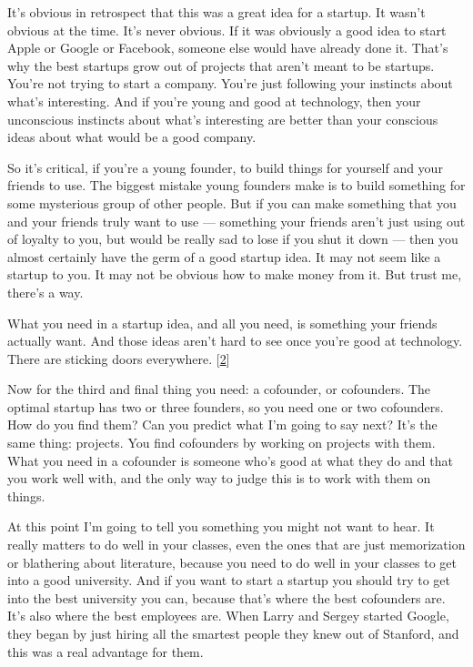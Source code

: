 It's obvious in retrospect that this
                  was a great idea for a startup. It wasn't obvious at the time.
                  It's never obvious. If it was obviously a good idea to start
                  Apple or Google or Facebook, someone else would have already
                  done it. That's why the best startups grow out of projects
                  that aren't meant to be startups. You're not trying to start a
                  company. You're just following your instincts about what's
                  interesting. And if you're young and good at technology, then
                  your unconscious instincts about what's interesting are better
                  than your conscious ideas about what would be a good
                  company.

So it's critical, if you're a young
                  founder, to build things for yourself and your friends to use.
                  The biggest mistake young founders make is to build something
                  for some mysterious group of other people. But if you can make
                  something that you and your friends truly want to use ---
                  something your friends aren't just using out of loyalty to
                  you, but would be really sad to lose if you shut it down
                  --- then you almost certainly have the germ of a good
                  startup idea. It may not seem like a startup to you. It may
                  not be obvious how to make money from it. But trust me,
                  there's a way.

What you need in a startup idea, and
                  all you need, is something your friends actually want. And
                  those ideas aren't hard to see once you're good at technology.
                  There are sticking doors everywhere.
                  [\href{\#f2n}{2}]

Now for the third and final thing you need: a
                  cofounder, or cofounders. The optimal startup has two or three
                  founders, so you need one or two cofounders. How do you find
                  them? Can you predict what I'm going to say next? It's the
                  same thing: projects. You find cofounders by working on
                  projects with them. What you need in a cofounder is someone
                  who's good at what they do and that you work well with, and
                  the only way to judge this is to work with them on things.

At
                  this point I'm going to tell you something you might not want
                  to hear. It really matters to do well in your classes, even
                  the ones that are just memorization or blathering about
                  literature, because you need to do well in your classes to get
                  into a good university. And if you want to start a startup you
                  should try to get into the best university you can, because
                  that's where the best cofounders are. It's also where the best
                  employees are. When Larry and Sergey started Google, they
                  began by just hiring all the smartest people they knew out of
                  Stanford, and this was a real advantage for them.

